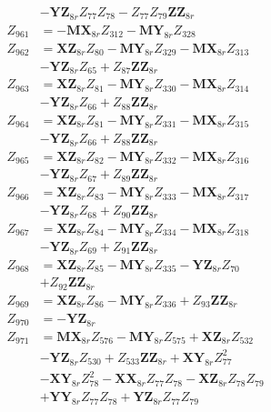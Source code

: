 \begin{multicols}{2}
\begin{align}
&- \mathbf{YZ}_{8r}Z_{77}Z_{78} - Z_{77}Z_{79}\mathbf{ZZ}_{8r} \nonumber \\
Z_{961} &= - \mathbf{MX}_{8r}Z_{312} - \mathbf{MY}_{8r}Z_{328} \nonumber \\
Z_{962} &= \mathbf{XZ}_{8r}Z_{80} - \mathbf{MY}_{8r}Z_{329} - \mathbf{MX}_{8r}Z_{313}  \nonumber \\
&- \mathbf{YZ}_{8r}Z_{65} + Z_{87}\mathbf{ZZ}_{8r} \nonumber \\
Z_{963} &= \mathbf{XZ}_{8r}Z_{81} - \mathbf{MY}_{8r}Z_{330} - \mathbf{MX}_{8r}Z_{314}  \nonumber \\
&- \mathbf{YZ}_{8r}Z_{66} + Z_{88}\mathbf{ZZ}_{8r} \nonumber \\
Z_{964} &= \mathbf{XZ}_{8r}Z_{81} - \mathbf{MY}_{8r}Z_{331} - \mathbf{MX}_{8r}Z_{315}  \nonumber \\
&- \mathbf{YZ}_{8r}Z_{66} + Z_{88}\mathbf{ZZ}_{8r} \nonumber \\
Z_{965} &= \mathbf{XZ}_{8r}Z_{82} - \mathbf{MY}_{8r}Z_{332} - \mathbf{MX}_{8r}Z_{316}  \nonumber \\
&- \mathbf{YZ}_{8r}Z_{67} + Z_{89}\mathbf{ZZ}_{8r} \nonumber \\
Z_{966} &= \mathbf{XZ}_{8r}Z_{83} - \mathbf{MY}_{8r}Z_{333} - \mathbf{MX}_{8r}Z_{317}  \nonumber \\
&- \mathbf{YZ}_{8r}Z_{68} + Z_{90}\mathbf{ZZ}_{8r} \nonumber \\
Z_{967} &= \mathbf{XZ}_{8r}Z_{84} - \mathbf{MY}_{8r}Z_{334} - \mathbf{MX}_{8r}Z_{318}  \nonumber \\
&- \mathbf{YZ}_{8r}Z_{69} + Z_{91}\mathbf{ZZ}_{8r} \nonumber \\
Z_{968} &= \mathbf{XZ}_{8r}Z_{85} - \mathbf{MY}_{8r}Z_{335} - \mathbf{YZ}_{8r}Z_{70}  \nonumber \\
&+ Z_{92}\mathbf{ZZ}_{8r} \nonumber \\
Z_{969} &= \mathbf{XZ}_{8r}Z_{86} - \mathbf{MY}_{8r}Z_{336} + Z_{93}\mathbf{ZZ}_{8r} \nonumber \\
Z_{970} &= -\mathbf{YZ}_{8r} \nonumber \\
Z_{971} &= \mathbf{MX}_{8r}Z_{576} - \mathbf{MY}_{8r}Z_{575} + \mathbf{XZ}_{8r}Z_{532}  \nonumber \\
&- \mathbf{YZ}_{8r}Z_{530} + Z_{533}\mathbf{ZZ}_{8r} + \mathbf{XY}_{8r}Z_{77}^2  \nonumber \\
&- \mathbf{XY}_{8r}Z_{78}^2 - \mathbf{XX}_{8r}Z_{77}Z_{78} - \mathbf{XZ}_{8r}Z_{78}Z_{79}  \nonumber \\
&+ \mathbf{YY}_{8r}Z_{77}Z_{78} + \mathbf{YZ}_{8r}Z_{77}Z_{79} \nonumber \\

\end{align}
\end{multicols}
